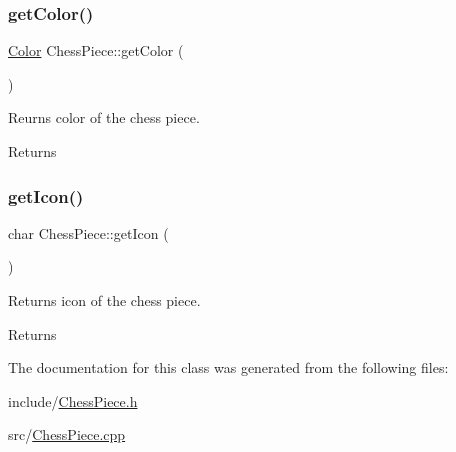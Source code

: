 \mbox{\label{classChessPiece_a99f599eac60792290e3bcb3bea1e0970}} 
\subsubsection{\texorpdfstring{get\+Color()}{getColor()}}
{\footnotesize\ttfamily \hyperlink{Enums_8h_ab87bacfdad76e61b9412d7124be44c1c}{Color} Chess\+Piece\+::get\+Color (\begin{DoxyParamCaption}{ }\end{DoxyParamCaption})}



Reurns color of the chess piece. 

\begin{DoxyReturn}{Returns}

\end{DoxyReturn}
\mbox{\label{classChessPiece_aee72609f866105f5676e007887877b7c}} 
\subsubsection{\texorpdfstring{get\+Icon()}{getIcon()}}
{\footnotesize\ttfamily char Chess\+Piece\+::get\+Icon (\begin{DoxyParamCaption}{ }\end{DoxyParamCaption})}



Returns icon of the chess piece. 

\begin{DoxyReturn}{Returns}

\end{DoxyReturn}


The documentation for this class was generated from the following files\+:\begin{DoxyCompactItemize}
\item 
include/\hyperlink{ChessPiece_8h}{Chess\+Piece.\+h}\item 
src/\hyperlink{ChessPiece_8cpp}{Chess\+Piece.\+cpp}\end{DoxyCompactItemize}
